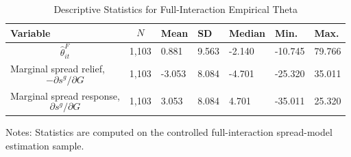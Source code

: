 \begin{table}[H]\centering
\begin{threeparttable}
\caption{Descriptive Statistics for Full-Interaction Empirical Theta}
\label{tab:theta_descriptive_stats}
\scriptsize
\begin{tabularx}{\textwidth}{lYYYYYY}
\toprule
Variable & $$N$$ & Mean & SD & Median & Min. & Max. \\
\midrule
$$\widehat{\theta}^{F}_{it}$$ & 1,103 & 0.881 & 9.563 & -2.140 & -10.745 & 79.766 \\
Marginal spread relief, $$-\partial s^g/\partial G$$ & 1,103 & -3.053 & 8.084 & -4.701 & -25.320 & 35.011 \\
Marginal spread response, $$\partial s^g/\partial G$$ & 1,103 & 3.053 & 8.084 & 4.701 & -35.011 & 25.320 \\
\bottomrule
\end{tabularx}
\begin{tablenotes}[flushleft]\footnotesize
\item Notes: Statistics are computed on the controlled full-interaction spread-model estimation sample.
\end{tablenotes}
\end{threeparttable}
\end{table}
